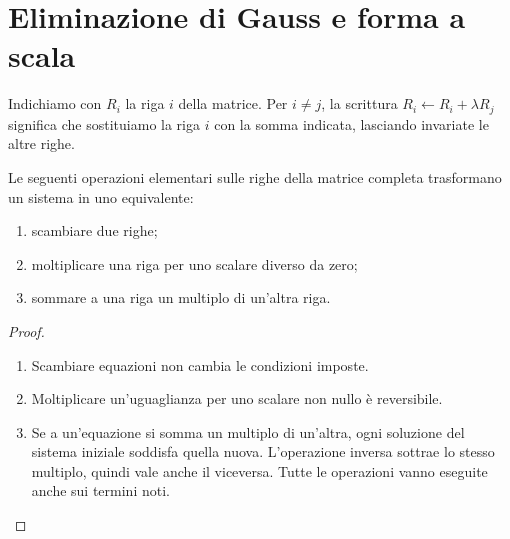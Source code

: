 \section{Eliminazione di Gauss e forma a scala}
\begin{proposizione}
Indichiamo con $R_i$ la riga $i$ della matrice. Per $i\ne j$, la scrittura $R_i\leftarrow R_i+\lambda R_j$ significa che sostituiamo la riga $i$ con la somma indicata, lasciando invariate le altre righe.

Le seguenti operazioni elementari sulle righe della matrice completa trasformano un sistema in uno equivalente:
\begin{enumerate}
\item scambiare due righe;
\item moltiplicare una riga per uno scalare diverso da zero;
\item sommare a una riga un multiplo di un'altra riga.
\end{enumerate}
\end{proposizione}
\begin{proof}
\begin{enumerate}[label=\arabic*.]
\item Scambiare equazioni non cambia le condizioni imposte.
\item Moltiplicare un'uguaglianza per uno scalare non nullo è reversibile.
\item Se a un'equazione si somma un multiplo di un'altra, ogni soluzione del sistema iniziale soddisfa quella nuova. L'operazione inversa sottrae lo stesso multiplo, quindi vale anche il viceversa. Tutte le operazioni vanno eseguite anche sui termini noti.
\end{enumerate}
\end{proof}

